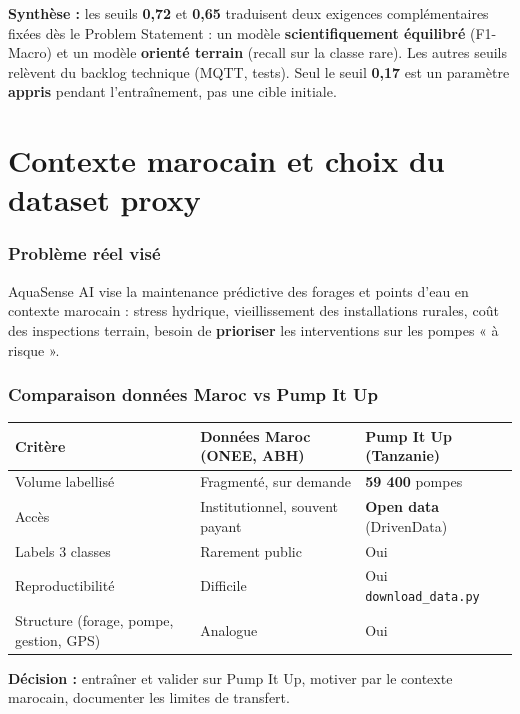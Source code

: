 \documentclass[11pt,a4paper]{report}
\begin{document}
\textbf{Synthèse :} les seuils \textbf{0,72} et \textbf{0,65} traduisent deux exigences complémentaires fixées dès le Problem Statement : un modèle \textbf{scientifiquement équilibré} (F1-Macro) et un modèle \textbf{orienté terrain} (recall sur la classe rare). Les autres seuils relèvent du backlog technique (MQTT, tests). Seul le seuil \textbf{0,17} est un paramètre \textbf{appris} pendant l'entraînement, pas une cible initiale.

\chapter{Contexte marocain et choix du dataset proxy}

\subsection{Problème réel visé}

AquaSense AI vise la maintenance prédictive des forages et points d'eau en contexte marocain : stress hydrique, vieillissement des installations rurales, coût des inspections terrain, besoin de \textbf{prioriser} les interventions sur les pompes « à risque ».

\subsection{Comparaison données Maroc vs Pump It Up}

{\small
\begin{longtable}{@{}>{\raggedright\arraybackslash}p{}>{\raggedright\arraybackslash}p{}>{\raggedright\arraybackslash}p{}@{}}
\toprule
\rowcolor{EHTPTableHead}Critère & Données Maroc (ONEE, ABH) & Pump It Up (Tanzanie) \\
\midrule
Volume labellisé & Fragmenté, sur demande & \textbf{59 400} pompes \\
Accès & Institutionnel, souvent payant & \textbf{Open data} (DrivenData) \\
Labels 3 classes & Rarement public & Oui \\
Reproductibilité & Difficile & Oui \texttt{download\_data.py} \\
Structure (forage, pompe, gestion, GPS) & Analogue & Oui \\
\bottomrule
\end{longtable}
}

\textbf{Décision :} entraîner et valider sur Pump It Up, motiver par le contexte marocain, documenter les limites de transfert.
\end{document}

